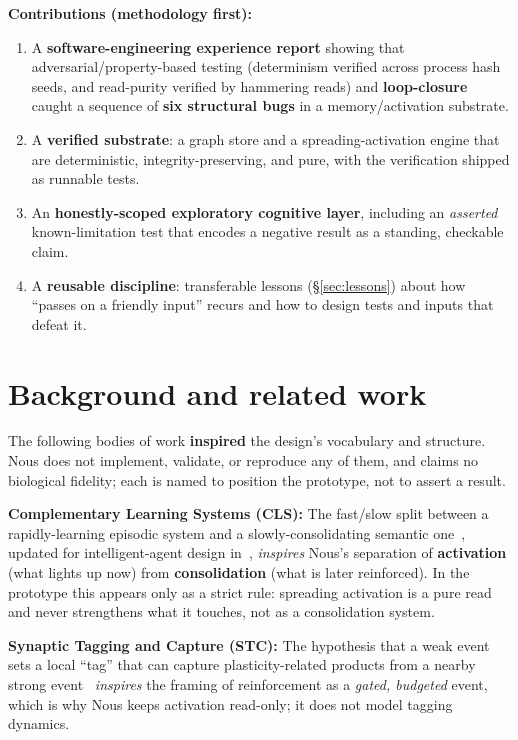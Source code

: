 \documentclass[11pt]{article}
\begin{document}
\textbf{Contributions (methodology first):}
\begin{enumerate}[nosep]
  \item A \textbf{software-engineering experience report} showing that adversarial/property-based
        testing (determinism verified across process hash seeds, and read-purity verified by hammering
        reads) and \textbf{loop-closure} caught a sequence of \textbf{six structural bugs} in a
        memory/activation substrate.
  \item A \textbf{verified substrate}: a graph store and a spreading-activation engine that are
        deterministic, integrity-preserving, and pure, with the verification shipped as runnable tests.
  \item An \textbf{honestly-scoped exploratory cognitive layer}, including an \emph{asserted}
        known-limitation test that encodes a negative result as a standing, checkable claim.
  \item A \textbf{reusable discipline}: transferable lessons (\S\ref{sec:lessons}) about how ``passes on
        a friendly input'' recurs and how to design tests and inputs that defeat it.
\end{enumerate}

\section{Background and related work}

The following bodies of work \textbf{inspired} the design's vocabulary and structure. Nous does not
implement, validate, or reproduce any of them, and claims no biological fidelity; each is named to
position the prototype, not to assert a result.

\textbf{Complementary Learning Systems (CLS):} The fast/slow split between a rapidly-learning episodic
system and a slowly-consolidating semantic one~\cite{mcclelland1995}, updated for intelligent-agent
design in~\cite{kumaran2016}, \emph{inspires} Nous's separation of \textbf{activation} (what lights up
now) from \textbf{consolidation} (what is later reinforced). In the prototype this appears only as a
strict rule: spreading activation is a pure read and never strengthens what it touches, not as a
consolidation system.

\textbf{Synaptic Tagging and Capture (STC):} The hypothesis that a weak event sets a local ``tag'' that
can capture plasticity-related products from a nearby strong event~\cite{frey1997, redondo2011}
\emph{inspires} the framing of reinforcement as a \emph{gated, budgeted} event, which is why Nous keeps
activation read-only; it does not model tagging dynamics.
\end{document}
